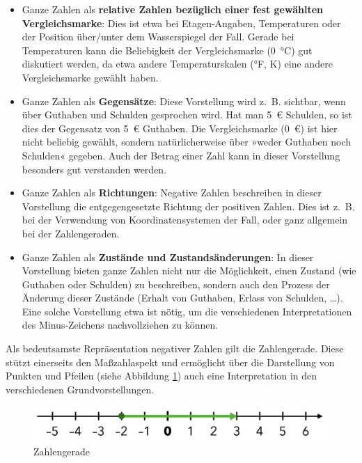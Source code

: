 \documentclass[
]{scrbook}
\providecommand{\tightlist}{%
  \setlength{\itemsep}{0pt}\setlength{\parskip}{0pt}}
\theoremstyle{definition}
\theoremstyle{definition}
\theoremstyle{definition}
\theoremstyle{definition}
\theoremstyle{remark}
\begin{document}
\begin{itemize}
\tightlist
\item
  Ganze Zahlen als \textbf{relative Zahlen bezüglich einer fest gewählten Vergleichsmarke}: Dies ist etwa bei Etagen-Angaben, Temperaturen oder der Position über/unter dem Wasserspiegel der Fall. Gerade bei Temperaturen kann die Beliebigkeit der Vergleichsmarke (0~°C) gut diskutiert werden, da etwa andere Temperaturskalen (°F, K) eine andere Vergleichsmarke gewählt haben.
\item
  Ganze Zahlen als \textbf{Gegensätze}: Diese Vorstellung wird z.~B. sichtbar, wenn über Guthaben und Schulden gesprochen wird. Hat man 5~€ Schulden, so ist dies der Gegensatz von 5~€ Guthaben. Die Vergleichsmarke (0~€) ist hier nicht beliebig gewählt, sondern natürlicherweise über »weder Guthaben noch Schulden« gegeben. Auch der Betrag einer Zahl kann in dieser Vorstellung besonders gut verstanden werden.
\item
  Ganze Zahlen als \textbf{Richtungen}: Negative Zahlen beschreiben in dieser Vorstellung die entgegengesetzte Richtung der positiven Zahlen. Dies ist z.~B. bei der Verwendung von Koordinatensystemen der Fall, oder ganz allgemein bei der Zahlengeraden.
\item
  Ganze Zahlen als \textbf{Zustände und Zustandsänderungen}: In dieser Vorstellung bieten ganze Zahlen nicht nur die Möglichkeit, einen Zustand (wie Guthaben oder Schulden) zu beschreiben, sondern auch den Prozess der Änderung dieser Zustände (Erhalt von Guthaben, Erlass von Schulden, \ldots). Eine solche Vorstellung etwa ist nötig, um die verschiedenen Interpretationen des Minus-Zeichens nachvollziehen zu können.
\end{itemize}

Als bedeutsamste Repräsentation negativer Zahlen gilt die Zahlengerade. Diese stützt einerseits den Maßzahlaspekt und ermöglicht über die Darstellung von Punkten und Pfeilen (siehe Abbildung \ref{fig:Zahlengerade}) auch eine Interpretation in den verschiedenen Grundvorstellungen.

\begin{figure}

{\centering \includegraphics[width=0.75\linewidth]{pictures/9-Zahlengerade} 

}

\caption{Zahlengerade}\label{fig:Zahlengerade}
\end{figure}
\end{document}
